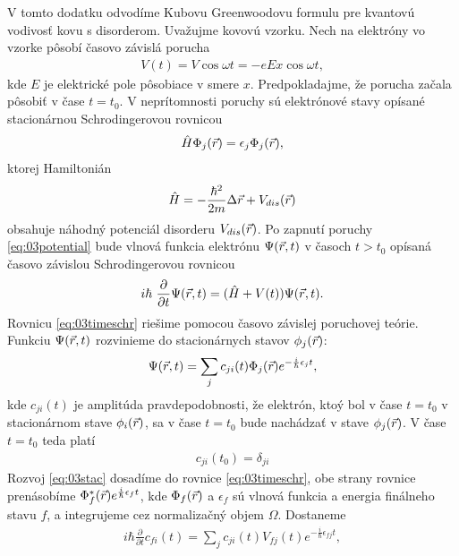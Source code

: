 V tomto dodatku odvodíme Kubovu Greenwoodovu formulu pre kvantovú vodivosť kovu s disorderom. Uvažujme kovovú vzorku. Nech na elektróny vo vzorke pôsobí časovo závislá porucha
\begin{align}
\label{eq:03potential}
V(t)=V\cos \omega t = -eEx \cos \omega t \mathrm{,}
\end{align}
kde $E$ je elektrické pole pôsobiace v smere $x$. Predpokladajme, že porucha začala pôsobiť v čase $t=t_0$.
V neprítomnosti poruchy sú elektrónové stavy opísané stacionárnou Schrodingerovou rovnicou
\begin{align}
\label{eq:03schr}
\hat{H} \Phi_j(\vec{r})= \epsilon_j\Phi_j(\vec{r}) \mathrm{,}
\end{align}
ktorej Hamiltonián
\begin{align}
\label{eq:03Hamiltonian}
\hat{H}= - \frac{\hbar^2}{2m}\Delta \vec{r} + V_{dis}(\vec{r}) \mathrm{}
\end{align}
obsahuje náhodný potenciál disorderu $V_{dis}(\vec{r})$. Po zapnutí poruchy \eqref{eq:03potential}
bude vlnová funkcia elektrónu $\Psi(\vec{r},t)$ v časoch $t>t_0$ opísaná časovo závislou Schrodingerovou rovnicou
\begin{align}
\label{eq:03timeschr}
i\hbar\ \frac{\partial}{\partial t} \Psi(\vec{r},t) = (\hat{H} + V(t))\Psi(\vec{r},t)\mathrm{.}
\end{align}
Rovnicu \eqref{eq:03timeschr} riešime pomocou časovo závislej poruchovej teórie. Funkciu $\Psi(\vec{r},t)$ rozvinieme do stacionárnych stavov $\phi_j(\vec{r})$:
\begin{align}
\label{eq:03stac}
\Psi(\vec{r},t)=\sum_j c_{ji}(t)\Phi_j(\vec{r})e^{-\frac{i}{\hbar}\epsilon_jt} \mathrm{,}
\end{align}
kde $c_{ji}(t)$ je amplitúda pravdepodobnosti, že elektrón, ktoý bol v čase $t=t_0$ v stacionárnom stave $\phi_i(\vec{r})$, sa v čase $t=t_0$ bude nachádzať v stave $\phi_j(\vec{r})$. V čase $t=t_0$ teda platí
\begin{align}
\label{eq:03cji0}
c_{ji}(t_0)=\delta_{ji}
\end{align}
Rozvoj \eqref{eq:03stac} dosadíme do rovnice \eqref{eq:03timeschr}, obe strany rovnice prenásobíme $\Phi^{\ast}_f(\vec{r})e^{\frac{i}{\hbar}\epsilon_f t}$, kde $\Phi_f(\vec{r})$ a $\epsilon_f$ sú vlnová funkcia a energia finálneho stavu $f$, a integrujeme cez normalizačný objem $\Omega$.
Dostaneme
\begin{align}
\label{eq:03timeschr_expanded}
i\hbar\frac{\partial}{\partial t}c_{fi}(t)=\sum_j c_{ji}(t) V_{fj}(t)e^{-\frac{i }{\hbar}\epsilon_{fj} t} \mathrm{,}
\end{align}
